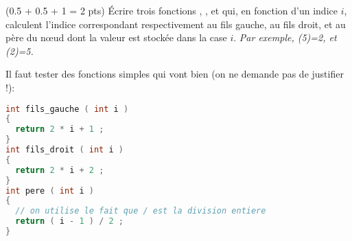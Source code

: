 \question (0.5 + 0.5 + 1 = 2 pts) {\'E}crire trois fonctions
, , et  qui, en
fonction d'un indice $i$, calculent l'indice correspondant
respectivement au fils gauche, au fils droit, et au p{\`e}re du n\oe ud
dont la valeur est stock{\'e}e dans la case $i$. \emph{Par exemple,
  (5)=2, et (2)=5.}

\begin{solution}
  Il faut tester des fonctions simples qui vont bien (on ne demande pas de justifier !):
  \begin{lstlisting}[language=C]
int fils_gauche ( int i )
{
  return 2 * i + 1 ;
}
int fils_droit ( int i )
{
  return 2 * i + 2 ;
}
int pere ( int i )
{
  // on utilise le fait que / est la division entiere
  return ( i - 1 ) / 2 ;
}
  \end{lstlisting}
\end{solution}

\vspace*{1em}


